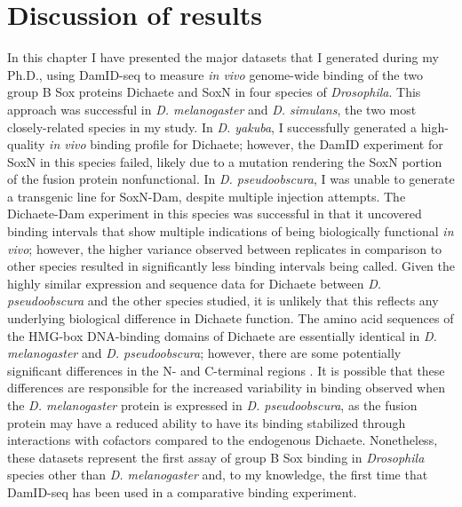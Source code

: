 \section{Discussion of results}
In this chapter I have presented the major datasets that I generated during my Ph.D., using DamID-seq to measure \emph{in vivo} genome-wide binding of the two group B Sox proteins Dichaete and SoxN in four species of \emph{Drosophila}. This approach was successful in \emph{D. melanogaster} and \emph{D. simulans}, the two most closely-related species in my study. In \emph{D. yakuba}, I successfully generated a high-quality \emph{in vivo} binding profile for Dichaete; however, the DamID experiment for SoxN in this species failed, likely due to a mutation rendering the SoxN portion of the fusion protein nonfunctional. In \emph{D. pseudoobscura}, I was unable to generate a transgenic line for SoxN-Dam, despite multiple injection attempts. The Dichaete-Dam experiment in this species was successful in that it uncovered binding intervals that show multiple indications of being biologically functional \emph{in vivo}; however, the higher variance observed between replicates in comparison to other species resulted in significantly less binding intervals being called. Given the highly similar expression and sequence data for Dichaete between \emph{D. pseudoobscura} and the other species studied, it is unlikely that this reflects any underlying biological difference in Dichaete function. The amino acid sequences of the HMG-box DNA-binding domains of Dichaete are essentially identical in \emph{D. melanogaster} and \emph{D. pseudoobscura}; however, there are some potentially significant differences in the N- and C-terminal regions \citep{mckimmie_conserved_2005}. It is possible that these differences are responsible for the increased variability in binding observed when the \emph{D. melanogaster} protein is expressed in \emph{D. pseudoobscura}, as the fusion protein may have a reduced ability to have its binding stabilized through interactions with cofactors compared to the endogenous Dichaete. Nonetheless, these datasets represent the first assay of group B Sox binding in \emph{Drosophila} species other than \emph{D. melanogaster} and, to my knowledge, the first time that DamID-seq has been used in a comparative binding experiment.\\ 

